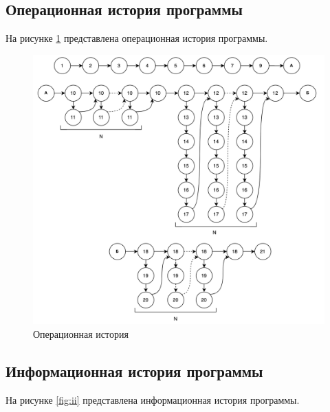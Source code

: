 \clearpage

\subsection{Операционная история программы}

На рисунке \ref{fig:oi} представлена операционная история программы.

\begin{figure}[h!]
	\centering
	\includegraphics[width=0.9\linewidth]{inc/img/ои.png}
	\caption{Операционная история}
	\label{fig:oi}
\end{figure}

\clearpage

\subsection{Информационная история программы}

На рисунке \ref{fig:ii} представлена информационная история программы.

